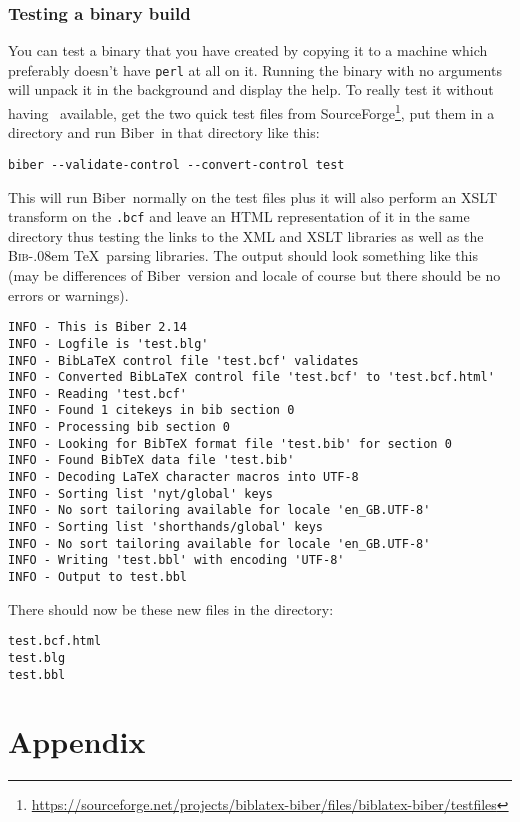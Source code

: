 \documentclass{ltxdockit}
\def\BibTeX{\textsc{Bib}\kern-.08em \TeX}
\newcommand*{\biber}{Biber\xspace}
\begin{document}
\subsubsection{Testing a binary build}
You can test a binary that you have created by copying it to a machine
which preferably doesn't have \verb+perl+ at all on it. Running the binary with no
arguments will unpack it in the background and display the help. To really
test it without having \latex\ available, get the two quick test files from
SourceForge\footnote{\url{https://sourceforge.net/projects/biblatex-biber/files/biblatex-biber/testfiles}},
put them in a directory and run \biber\ in that directory like this:

\begin{verbatim}
biber --validate-control --convert-control test
\end{verbatim}

\noindent This will run \biber\ normally on the test files plus it
will also perform an XSLT transform on the \verb+.bcf+ and
leave an HTML representation of it in the same directory thus testing the
links to the XML and XSLT libraries as well as the \BibTeX\ parsing
libraries. The output should look something like this (may be differences
of \biber\ version and locale of course but there should be no errors
or warnings).

\begin{verbatim}
INFO - This is Biber 2.14
INFO - Logfile is 'test.blg'
INFO - BibLaTeX control file 'test.bcf' validates
INFO - Converted BibLaTeX control file 'test.bcf' to 'test.bcf.html'
INFO - Reading 'test.bcf'
INFO - Found 1 citekeys in bib section 0
INFO - Processing bib section 0
INFO - Looking for BibTeX format file 'test.bib' for section 0
INFO - Found BibTeX data file 'test.bib'
INFO - Decoding LaTeX character macros into UTF-8
INFO - Sorting list 'nyt/global' keys
INFO - No sort tailoring available for locale 'en_GB.UTF-8'
INFO - Sorting list 'shorthands/global' keys
INFO - No sort tailoring available for locale 'en_GB.UTF-8'
INFO - Writing 'test.bbl' with encoding 'UTF-8'
INFO - Output to test.bbl
\end{verbatim}

\noindent There should now be these new files in the directory:

\begin{verbatim}
test.bcf.html
test.blg
test.bbl
\end{verbatim}

\appendix
\section{Appendix}
\end{document}
